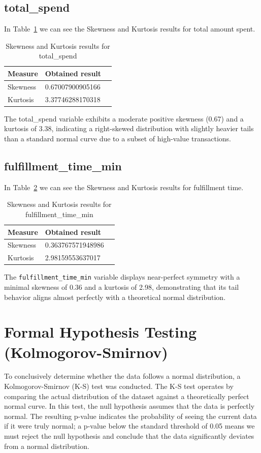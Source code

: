 \documentclass[12pt]{report}
\begin{document}
\subsection{total\_spend}
In Table~\ref{tab:skew_kurt_total_spend} we can see the Skewness and Kurtosis results for total amount spent.
\begin{table}[H]

    \centering
    \begin{tabular}{|l|l|l|}
        \hline
        Measure  & Obtained result  \\ \hline
        Skewness & 0.67007900905166 \\ \hline
        Kurtosis & 3.37746288170318 \\ \hline
    \end{tabular}

    \caption{Skewness and Kurtosis results for total\_spend}\label{tab:skew_kurt_total_spend}
\end{table}
The total\_spend variable exhibits a moderate positive skewness (0.67) and a kurtosis of 3.38, indicating a right-skewed distribution with slightly heavier tails than a standard normal curve due to a subset of high-value transactions.
\subsection{fulfillment\_time\_min}
In Table~\ref{tab:skew_kurt_fulfillment_time} we can see the Skewness and Kurtosis results for fulfillment time.
\begin{table}[H]

    \centering
    \begin{tabular}{|l|l|l|}
        \hline
        Measure  & Obtained result   \\ \hline
        Skewness & 0.363767571948986 \\ \hline
        Kurtosis & 2.98159553637017  \\ \hline
    \end{tabular}

    \caption{Skewness and Kurtosis results for fulfillment\_time\_min}\label{tab:skew_kurt_fulfillment_time}
\end{table}
The \texttt{fulfillment\_time\_min} variable displays near-perfect symmetry with a minimal skewness of 0.36 and a kurtosis of 2.98, demonstrating that its tail behavior aligns almost perfectly with a theoretical normal distribution.
\section{Formal Hypothesis Testing (Kolmogorov-Smirnov)}
To conclusively determine whether the data follows a normal distribution, a Kolmogorov-Smirnov (K-S) test was conducted. The K-S test operates by comparing the actual distribution of the dataset against a theoretically perfect normal curve. In this test, the null hypothesis assumes that the data is perfectly normal. The resulting p-value indicates the probability of seeing the current data if it were truly normal; a p-value below the standard threshold of 0.05 means we must reject the null hypothesis and conclude that the data significantly deviates from a normal distribution.
\end{document}

